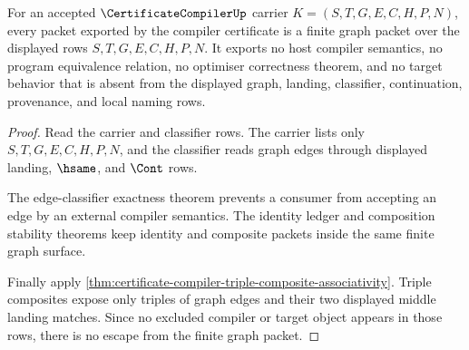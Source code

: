 \begin{theorem}
\label{thm:certificate-compiler-finite-graph-nonescape}
For an accepted $\CertificateCompilerUp$ carrier $K=(S,T,G,E,C,H,P,N)$, every packet exported by the compiler certificate is a finite graph packet over the displayed rows $S,T,G,E,C,H,P,N$. It exports no host compiler semantics, no program equivalence relation, no optimiser correctness theorem, and no target behavior that is absent from the displayed graph, landing, classifier, continuation, provenance, and local naming rows.
\end{theorem}
\begin{proof}
Read the carrier and classifier rows. The carrier lists only $S,T,G,E,C,H,P,N$, and the classifier reads graph edges through displayed landing, $\hsame$, and $\Cont$ rows.

The edge-classifier exactness theorem prevents a consumer from accepting an edge by an external compiler semantics. The identity ledger and composition stability theorems keep identity and composite packets inside the same finite graph surface.

Finally apply \autoref{thm:certificate-compiler-triple-composite-associativity}. Triple composites expose only triples of graph edges and their two displayed middle landing matches. Since no excluded compiler or target object appears in those rows, there is no escape from the finite graph packet.
\end{proof}


